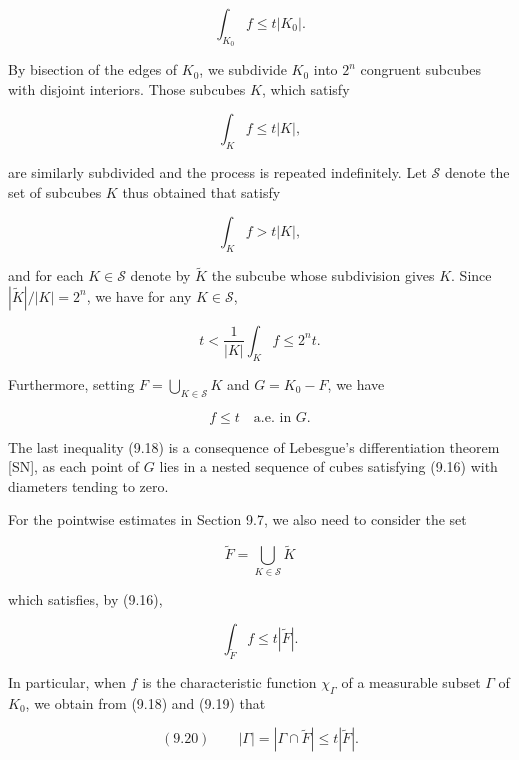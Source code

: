 \[
\int_{K_0} f \leq t|K_0|.
\]

By bisection of the edges of $K_0$, we subdivide $K_0$ into $2^n$ congruent subcubes with disjoint interiors. Those subcubes $K$, which satisfy

\begin{equation}
\int_K f \leq t|K|,
\tag{9.16}
\end{equation}

are similarly subdivided and the process is repeated indefinitely. Let $\mathcal{S}$ denote the set of subcubes $K$ thus obtained that satisfy

\[
\int_K f > t|K|,
\]

and for each $K \in \mathcal{S}$ denote by $\widetilde{K}$ the subcube whose subdivision gives $K$. Since $|\widetilde{K}|/|K| = 2^n$, we have for any $K \in \mathcal{S}$,

\begin{equation}
t < \frac{1}{|K|}\int_K f \leq 2^n t.
\tag{9.17}
\end{equation}

Furthermore, setting $F = \bigcup_{K \in \mathcal{S}} K$ and $G = K_0 - F$, we have

\begin{equation}
f \leq t \quad \text{a.e. in } G.
\tag{9.18}
\end{equation}

The last inequality (9.18) is a consequence of Lebesgue's differentiation theorem [SN], as each point of $G$ lies in a nested sequence of cubes satisfying (9.16) with diameters tending to zero.

For the pointwise estimates in Section 9.7, we also need to consider the set

\[
\widetilde{F} = \bigcup_{K \in \mathcal{S}} \widetilde{K}
\]

which satisfies, by (9.16),

\begin{equation}
\int_{\widetilde{F}} f \leq t|\widetilde{F}|.
\tag{9.19}
\end{equation}


In particular, when $f$ is the characteristic function $\chi_{\Gamma}$ of a measurable subset $\Gamma$ of
$K_{0}$, we obtain from (9.18) and (9.19) that

\[
(9.20)\qquad |\Gamma| = |\Gamma \cap \widetilde{F}| \leq t|\widetilde{F}|.
\]

\bigskip

